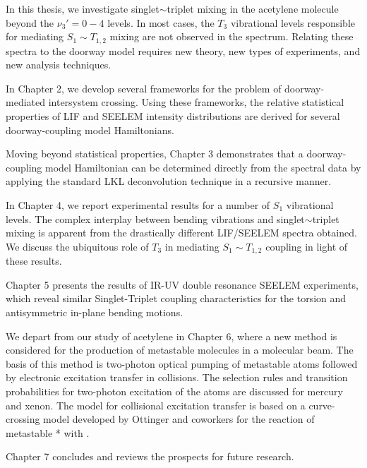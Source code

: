 \documentclass[12pt]{mitthesis}
\begin{document}
In this thesis, we investigate singlet$\sim$triplet mixing in the
acetylene molecule beyond the $\nu_3'=0-4$ levels.  In most cases, the
$T_3$ vibrational levels responsible for mediating $S_1 \sim T_{1,2}$
mixing are not observed in the spectrum.  Relating these spectra to
the doorway model requires new theory, new types of experiments, and
new analysis techniques.

In Chapter 2, we develop several frameworks for the problem of
doorway-mediated intersystem crossing.  Using these frameworks, the
relative statistical properties of LIF and SEELEM intensity
distributions are derived for several doorway-coupling model
Hamiltonians.

Moving beyond statistical properties, Chapter 3 demonstrates that a
doorway-coupling model Hamiltonian can be determined directly from the
spectral data by applying the standard LKL deconvolution technique in
a recursive manner.


In Chapter 4, we report experimental results for a number of $S_1$
vibrational levels.  The complex interplay between bending vibrations
and singlet$\sim$triplet mixing is apparent from the drastically
different LIF/SEELEM spectra obtained.  We discuss the ubiquitous role
of $T_3$ in mediating $S_1 \sim T_{1,2}$ coupling in light of these
results.

Chapter 5 presents the results of IR-UV double resonance SEELEM
experiments, which reveal similar Singlet-Triplet coupling
characteristics for the torsion and antisymmetric in-plane bending
motions.

We depart from our study of acetylene in Chapter 6, where a new method
is considered for the production of metastable molecules in a
molecular beam.  The basis of this method is two-photon optical
pumping of metastable atoms followed by electronic excitation transfer
in collisions.  The selection rules and transition probabilities for
two-photon excitation of the atoms are discussed for mercury and
xenon.  The model for collisional excitation transfer is based on a
curve-crossing model developed by Ottinger and coworkers for the
reaction of metastable * with .  

Chapter 7 concludes and reviews the prospects for future research.



\end{document}
